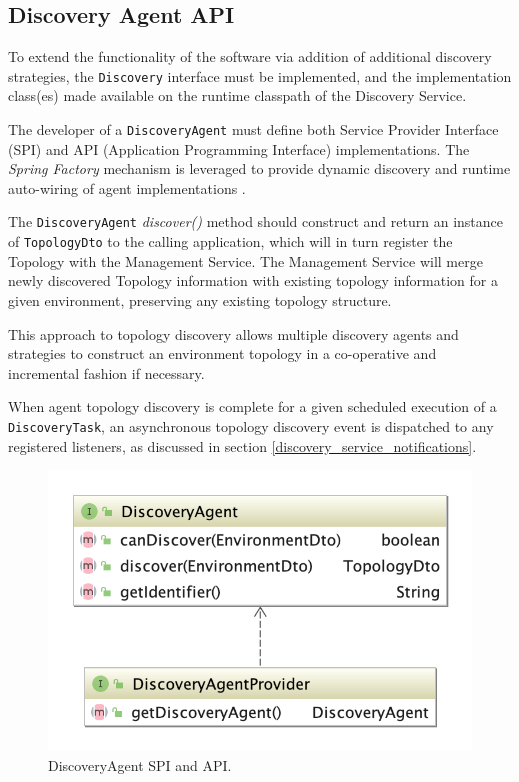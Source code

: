 \subsection{Discovery Agent API}
To extend the functionality of the software via addition of additional discovery strategies, the \texttt{Discovery} interface must be implemented, and the implementation class(es) made available on the runtime classpath of the Discovery Service. 

The developer of a \texttt{DiscoveryAgent} must define both Service Provider Interface (SPI) and API (Application Programming Interface) implementations. The \textit{Spring Factory} mechanism is leveraged to provide dynamic discovery and runtime auto-wiring of agent implementations \cite{SpringFactories}.

 The \texttt{DiscoveryAgent} \textit{discover()} method should construct and return an instance of \texttt{TopologyDto} to the calling application, which will in turn register the Topology with the Management Service. The Management Service will merge newly discovered Topology information with existing topology information for a given environment, preserving any existing topology structure.

This approach to topology discovery allows multiple discovery agents and strategies to construct an environment topology in a co-operative and incremental fashion if necessary.

When agent topology discovery is complete for a given scheduled execution of a \texttt{DiscoveryTask}, an asynchronous topology discovery event is dispatched to any registered listeners, as discussed in section \ref{discovery_service_notifications}.

\begin{figure}[H]
	\centering  
	\includegraphics[scale=2.0]{figures/impl/discovery/agent_api.png}
	\caption{DiscoveryAgent SPI and API.}
	\label{discovery_agent_api}
\end{figure}

